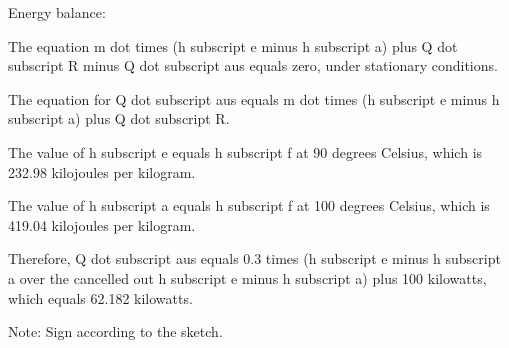 Energy balance:

The equation m dot times (h subscript e minus h subscript a) plus Q dot subscript R minus Q dot subscript aus equals zero, under stationary conditions.

The equation for Q dot subscript aus equals m dot times (h subscript e minus h subscript a) plus Q dot subscript R.

The value of h subscript e equals h subscript f at 90 degrees Celsius, which is 232.98 kilojoules per kilogram.

The value of h subscript a equals h subscript f at 100 degrees Celsius, which is 419.04 kilojoules per kilogram.

Therefore, Q dot subscript aus equals 0.3 times (h subscript e minus h subscript a over the cancelled out h subscript e minus h subscript a) plus 100 kilowatts, which equals 62.182 kilowatts.

Note: Sign according to the sketch.